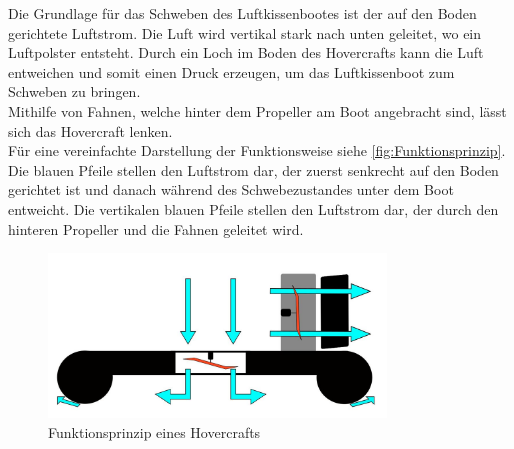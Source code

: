 Die Grundlage für das Schweben des Luftkissenbootes ist der auf den Boden gerichtete Luftstrom. Die Luft wird vertikal stark nach unten geleitet, wo ein Luftpolster entsteht. 
Durch ein Loch im Boden des Hovercrafts kann die Luft entweichen und somit einen Druck erzeugen, um das Luftkissenboot zum Schweben zu bringen. \\
Mithilfe von Fahnen, welche hinter dem Propeller am Boot angebracht sind, lässt sich das Hovercraft lenken. \\ Für eine vereinfachte Darstellung der Funktionsweise siehe 
\autoref{fig:Funktionsprinzip}. Die blauen Pfeile stellen den Luftstrom dar, der zuerst senkrecht auf den Boden gerichtet ist und danach während des Schwebezustandes unter dem Boot
entweicht. Die vertikalen blauen Pfeile stellen den Luftstrom dar, der durch den hinteren Propeller und die Fahnen geleitet wird. 

\begin{figure}[H]
  \centering
  \includegraphics[width=0.8\textwidth]{Fotos/Funktionsprinzip.JPG}
  \caption{Funktionsprinzip eines Hovercrafts  \label{fig:Funktionsprinzip}}
\end{figure}